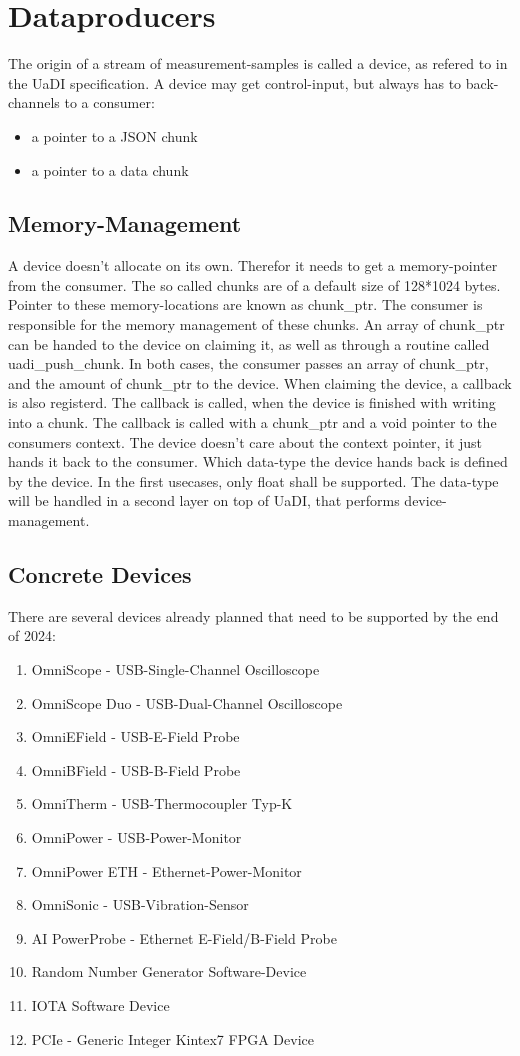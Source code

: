\chapter{Dataproducers}
The origin of a stream of measurement-samples is called a device, as refered to in the UaDI specification. 
A device may get control-input, but always has to back-channels to a consumer:
\begin{itemize}
    \item a pointer to a JSON chunk
    \item a pointer to a data chunk
\end{itemize}
\section{Memory-Management}
A device doesn't allocate on its own.
Therefor it needs to get a memory-pointer from the consumer.
The so called chunks are of a default size of 128*1024 bytes.
Pointer to these memory-locations are known as chunk\_ptr.
The consumer is responsible for the memory management of these chunks.
An array of chunk\_ptr can be handed to the device on claiming it, as well as through a routine called uadi\_push\_chunk.
In both cases, the consumer passes an array of chunk\_ptr, and the amount of chunk\_ptr to the device.
When claiming the device, a callback is also registerd. 
The callback is called, when the device is finished with writing into a chunk.
The callback is called with a chunk\_ptr and a void pointer to the consumers context. 
The device doesn't care about the context pointer, it just hands it back to the consumer.
Which data-type the device hands back is defined by the device. 
In the first usecases, only float shall be supported. 
The data-type will be handled in a second layer on top of UaDI, that performs device-management.

\section{Concrete Devices}
There are several devices already planned that need to be supported by the end of 2024:
\begin{enumerate}
    \item OmniScope - USB-Single-Channel Oscilloscope
    \item OmniScope Duo - USB-Dual-Channel Oscilloscope
    \item OmniEField - USB-E-Field Probe
    \item OmniBField - USB-B-Field Probe
    \item OmniTherm - USB-Thermocoupler Typ-K 
    \item OmniPower - USB-Power-Monitor
    \item OmniPower ETH - Ethernet-Power-Monitor
    \item OmniSonic - USB-Vibration-Sensor
    \item AI PowerProbe - Ethernet E-Field/B-Field Probe 
    \item Random Number Generator Software-Device
    \item IOTA Software Device 
    \item PCIe - Generic Integer Kintex7 FPGA Device
\end{enumerate}
